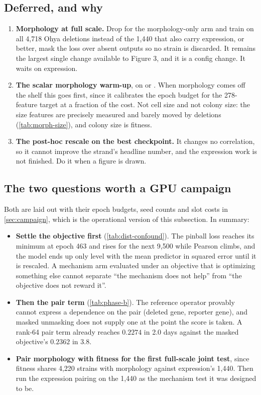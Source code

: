 \subsection{Deferred, and why}

\begin{enumerate}
\item \textbf{Morphology at full scale.} Drop  for the
  morphology-only arm and train on all 4,718 Ohya deletions instead of the 1,440 that also
  carry expression, or better, mask the loss over absent outputs so no strain is discarded.
  It remains the largest single change available to Figure 3, and it is a config change. It
  waits on expression.

\item \textbf{The scalar morphology warm-up}, on  or . When
  morphology comes off the shelf this goes first, since it calibrates the epoch budget for
  the 278-feature target at a fraction of the cost. Not cell size and not colony size: the
  size features are precisely measured and barely moved by deletions
  (\cref{tab:morph-size}), and colony size is fitness.

\item \textbf{The post-hoc rescale on the best checkpoint.} It changes no correlation, so it
  cannot improve the strand's headline number, and the expression work is not finished. Do
  it when a figure is drawn.
\end{enumerate}

\subsection{The two questions worth a GPU campaign}

Both are laid out with their epoch budgets, seed counts and slot costs in
\cref{sec:campaign}, which is the operational version of this subsection. In summary:

\begin{itemize}
\item \textbf{Settle the objective first} (\cref{tab:dist-confound}). The pinball loss reaches its
  minimum at epoch 463 and rises for the next 9,500 while Pearson climbs, and the model ends
  up only level with the mean predictor in squared error until it is rescaled. A mechanism
  arm evaluated under an objective that is optimizing something else cannot separate ``the
  mechanism does not help'' from ``the objective does not reward it''.
\item \textbf{Then the pair term} (\cref{tab:phase-b}). The reference operator provably
  cannot express a dependence on the pair (deleted gene, reporter gene), and masked
  unmasking does not supply one at the point the score is taken. A rank-64 pair term
  already reaches $0.2274$ in 2.0 days against the masked objective's $0.2362$ in 3.8.
\item \textbf{Pair morphology with fitness for the first full-scale joint test}, since
  fitness shares 4,220 strains with morphology against expression's 1,440. Then run the
  expression pairing on the 1,440 as the mechanism test it was designed to be.
\end{itemize}

